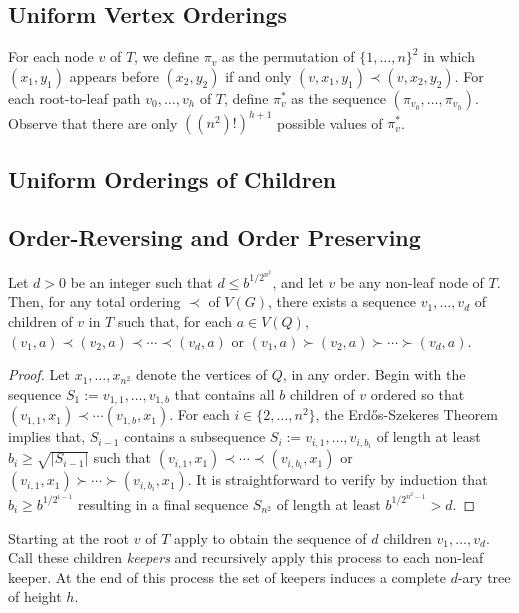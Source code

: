 \documentclass[kpfonts]{patmorin}
\begin{document}
\subsection{Uniform Vertex Orderings}

For each node $v$ of $T$, we define $\pi_v$ as the permutation of $\{1,\ldots,n\}^2$ in which $(x_1,y_1)$ appears before $(x_2,y_2)$ if and only $(v,x_1,y_1)\prec (v,x_2,y_2)$.  For each root-to-leaf path $v_0,\ldots,v_h$ of $T$, define $\pi^*_v$ as the sequence $(\pi_{v_0},\ldots,\pi_{v_h})$.  Observe that there are only $((n^2)!)^{h+1}$ possible values of $\pi^*_v$.


\subsection{Uniform Orderings of Children}

\subsection{Order-Reversing and Order Preserving}

\begin{lem}
    Let $d>0$ be an integer such that $d\le b^{1/2^{n^2}}$, and let $v$ be any non-leaf node of $T$.  Then, for any total ordering $\prec$ of $V(G)$, there exists a sequence $v_1,\ldots,v_d$ of children of $v$ in $T$ such that, for each $a\in V(Q)$, $(v_1,a)\prec (v_2,a)\prec\cdots\prec (v_d,a)$ or $(v_1,a)\succ (v_2,a)\succ\cdots\succ (v_d,a)$.
\end{lem}

\begin{proof}
    Let $x_1,\ldots,x_{n^2}$ denote the vertices of $Q$, in any order.
    Begin with the sequence $S_1:=v_{1,1},\ldots,v_{1,b}$ that contains all $b$ children of $v$ ordered so that $(v_{1,1},x_1)\prec\cdots(v_{1,b},x_1)$.  For each $i\in\{2,\ldots,n^2\}$, the Erd\H{o}s-Szekeres Theorem implies that, $S_{i-1}$ contains a subsequence $S_i:=v_{i,1},\ldots,v_{i,b_i}$ of length at least $b_i\ge \sqrt{|S_{i-1}|}$ such that $(v_{i,1},x_1)\prec\cdots\prec(v_{i,b_i},x_1)$ or $(v_{i,1},x_1)\succ\cdots\succ(v_{i,b_i},x_1)$.  It is straightforward to verify by induction that $b_i \ge b^{1/2^{i-1}}$ resulting in a final sequence $S_{n^2}$ of length at least $b^{1/2^{n^2-1}} > d$.
\end{proof}

Starting at the root $v$ of $T$ apply  to obtain the sequence of $d$ children $v_1,\ldots,v_d$.  Call these children \emph{keepers} and recursively apply this process to each non-leaf keeper.  At the end of this process the set of keepers induces a complete $d$-ary tree of height $h$.
\end{document}
